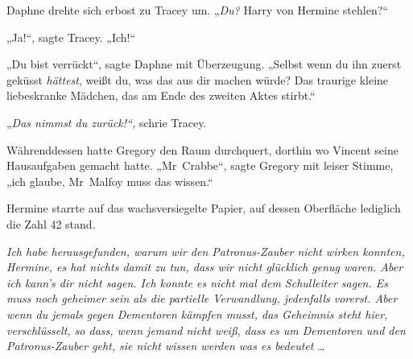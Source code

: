 Daphne drehte sich erbost zu Tracey um.
„\emph{Du?} Harry von Hermine stehlen?“

„Ja!“, sagte Tracey.
„Ich!“

„Du bist verrückt“, sagte Daphne mit Überzeugung.
„Selbst wenn du ihn zuerst geküsst \emph{hättest}, weißt du, was das aus dir machen würde? Das traurige kleine liebeskranke Mädchen, das am Ende des zweiten Aktes stirbt.“

„\emph{Das nimmst du zurück!“,} schrie Tracey.

Währenddessen hatte Gregory den Raum durchquert, dorthin wo Vincent seine Hausaufgaben gemacht hatte.
„Mr~Crabbe“, sagte Gregory mit leiser Stimme, „ich glaube, Mr~Malfoy muss das wissen.“


Hermine starrte auf das wachsversiegelte Papier, auf dessen Oberfläche lediglich die Zahl 42 stand.

\emph{Ich habe herausgefunden, warum wir den Patronus-Zauber nicht wirken konnten, Hermine, es hat nichts damit zu tun, dass wir nicht glücklich genug waren. Aber ich kann’s dir nicht sagen. Ich konnte es nicht mal dem Schulleiter sagen. Es muss noch geheimer sein als die partielle Verwandlung, jedenfalls vorerst. Aber wenn du jemals gegen Dementoren kämpfen musst, das Geheimnis steht hier, verschlüsselt, so dass, wenn jemand nicht weiß, dass es um Dementoren und den Patronus-Zauber geht, sie nicht wissen werden was es bedeutet} …


